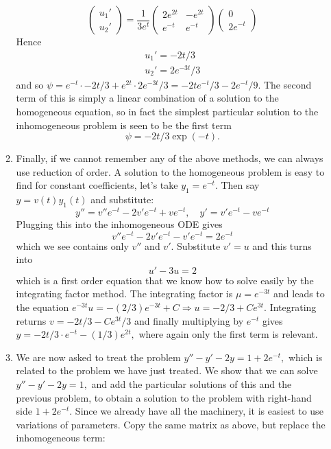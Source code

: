 \documentclass[10pt,a4paper]{letter}
\begin{document}
\begin{enumerate}
\begin{enumerate}
\begin{equation}
\begin{pmatrix}
u_1' \\
u_2'
\end{pmatrix}
= \frac{1}{3 e^{t}}
\begin{pmatrix}
2e^{2t} & -e^{2t} \\
e^{-t} & e^{-t}
\end{pmatrix}\begin{pmatrix}
0 \\
2e^{-t}
\end{pmatrix}
\end{equation}
Hence 
\begin{align*}
u_1' = -2t/3 \\
u_2' = 2e^{-3t}/3
\end{align*}
and so $\psi = e^{-t}\cdot -2t/3 + e^{2t} \cdot 2e^{-3t}/3 = -2te^{-t}/3 - 2 e^{-t}/9.$ The second term of this is simply a linear combination of a solution to the homogeneous equation, so in fact the simplest particular solution to the inhomogeneous problem is seen to be the first term
\[ \psi = -2t/3 \exp(-t).\]
\item Finally, if we cannot remember any of the above methods, we can always use reduction of order. A solution to the homogeneous problem is easy to find for constant coefficients, let's take $y_1 = e^{-t}.$ Then say $y = v(t) y_1(t)$ and substitute:
\[ y'' = v'' e^{-t} - 2v' e^{-t} + v e^{-t}, \quad y' = v'e^{-t} - v e^{-t} \]
Plugging this into the inhomogeneous ODE gives
\[ v''e^{-t} - 2v'e^{-t} - v'e^{-t} = 2 e^{-t} \]
which we see contains only $v''$ and $v'.$ Substitute $v' = u$ and this turns into 
\[ u' - 3u = 2 \]
which is a first order equation that we know how to solve easily by the integrating factor method. The integrating factor is $\mu = e^{-3t}$ and leads to the equation $e^{-3t} u = -(2/3) e^{-3t} + C \Rightarrow u = -2/3 + Ce^{3t}.$ Integrating returns $v = -2t/3 - Ce^{3t}/3$ and finally multiplying by $e^{-t}$ gives $y = -2t/3 \cdot e^{-t} - (1/3) e^{2t},$ where again only the first term is relevant.
\item We are now asked to treat the problem $y'' - y' - 2y = 1 + 2e^{-t},$ which is related to the problem we have just treated. We show that we can solve $y'' - y' - 2y = 1,$ and add the particular solutions of this and the previous problem, to obtain a solution to the problem with right-hand side $1 + 2 e^{-t}.$ 
Since we already have all the machinery, it is easiest to use variations of parameters. Copy the same matrix as above, but replace the inhomogeneous term:

\end{enumerate}
\end{enumerate}
\end{document}
